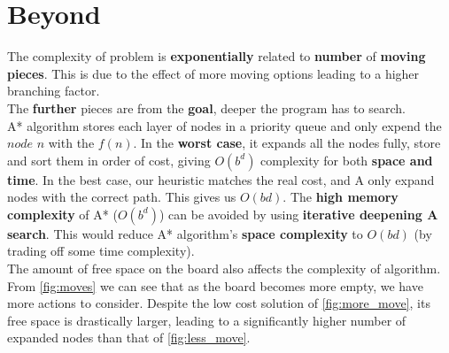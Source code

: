 \documentclass[10.5pt,a4paper]{article}
\begin{document}
    \section{Beyond}
    
        The complexity of problem is \textbf{exponentially} related to \textbf{number} of \textbf{moving pieces}. This is due to the effect of more moving options leading to a higher branching factor.\\
        The \textbf{further} pieces are from the \textbf{goal}, deeper the program has to search.\\
        A* algorithm stores each layer of nodes in a priority queue and only expend the $node$ $n$ with the $f(n)$. In the \textbf{worst case}, it expands all the nodes fully, store and sort them in order of cost, giving $O(b^d)$ complexity for both \textbf{space and time}. In the best case, our heuristic matches the real cost, and A only expand nodes with the correct path. This gives us $O(bd)$. The \textbf{high memory complexity} of A* ($O(b^d)$) can be avoided by using \textbf{iterative deepening A search}. This would reduce A* algorithm's \textbf{space complexity} to $O(bd)$ (by trading off some time complexity).\\
        The amount of free space on the board also affects the complexity of algorithm. From \ref{fig:moves} we can see that as the board becomes more empty, we have more actions to consider. Despite the low cost solution of \ref{fig:more_move}, its free space is drastically larger, leading to a significantly higher number of expanded nodes than that of \ref{fig:less_move}.
\end{document}
